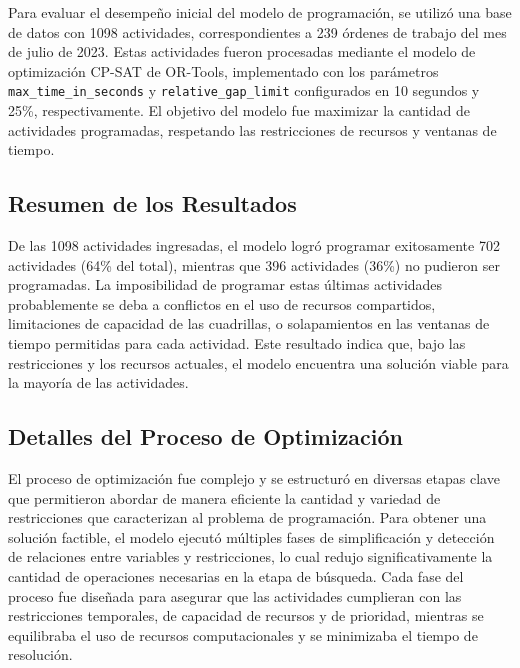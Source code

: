 \documentclass{article}
\begin{document}
Para evaluar el desempeño inicial del modelo de programación, se utilizó una base de datos con 1098 actividades, correspondientes a 239 órdenes de trabajo del mes de julio de 2023. Estas actividades fueron procesadas mediante el modelo de optimización CP-SAT de OR-Tools, implementado con los parámetros \texttt{max\_time\_in\_seconds} y \texttt{relative\_gap\_limit} configurados en 10 segundos y 25\%, respectivamente. El objetivo del modelo fue maximizar la cantidad de actividades programadas, respetando las restricciones de recursos y ventanas de tiempo.

\subsection{Resumen de los Resultados}

De las 1098 actividades ingresadas, el modelo logró programar exitosamente 702 actividades (64\% del total), mientras que 396 actividades (36\%) no pudieron ser programadas. La imposibilidad de programar estas últimas actividades probablemente se deba a conflictos en el uso de recursos compartidos, limitaciones de capacidad de las cuadrillas, o solapamientos en las ventanas de tiempo permitidas para cada actividad. Este resultado indica que, bajo las restricciones y los recursos actuales, el modelo encuentra una solución viable para la mayoría de las actividades.

\subsection{Detalles del Proceso de Optimización}

El proceso de optimización fue complejo y se estructuró en diversas etapas clave que permitieron abordar de manera eficiente la cantidad y variedad de restricciones que caracterizan al problema de programación. Para obtener una solución factible, el modelo ejecutó múltiples fases de simplificación y detección de relaciones entre variables y restricciones, lo cual redujo significativamente la cantidad de operaciones necesarias en la etapa de búsqueda. Cada fase del proceso fue diseñada para asegurar que las actividades cumplieran con las restricciones temporales, de capacidad de recursos y de prioridad, mientras se equilibraba el uso de recursos computacionales y se minimizaba el tiempo de resolución.
\end{document}
